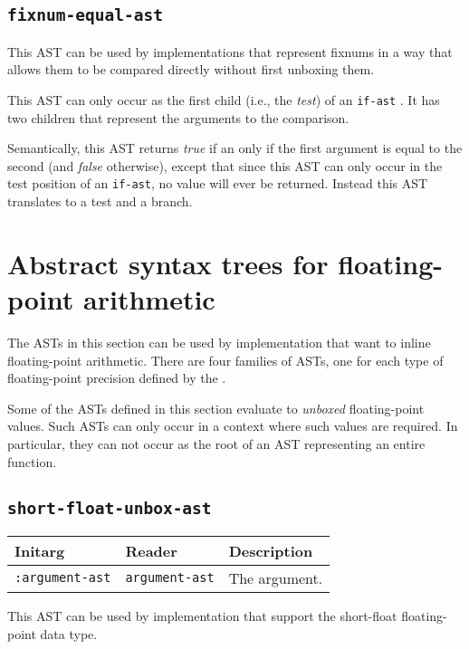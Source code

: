 \subsection{\texttt{fixnum-equal-ast}}
\label{fixnum-equal-ast}

This AST can be used by implementations that represent fixnums in a
way that allows them to be compared directly without first unboxing
them.

This AST can only occur as the first child (i.e., the \emph{test}) of
an \texttt{if-ast} .  It has two children that
represent the arguments to the comparison.  

Semantically, this AST returns \emph{true} if an only if the first
argument is equal to the second (and \emph{false} otherwise), except
that since this AST can only occur in the test position of an
\texttt{if-ast}, no value will ever be returned.  Instead this AST
translates to a test and a branch.

\section{Abstract syntax trees for floating-point arithmetic}
\label{sec-ast-floating-point-arithmetic}

The ASTs in this section can be used by implementation that want to
inline floating-point arithmetic.  There are four families of ASTs,
one for each type of floating-point precision defined by the \hs{}.

Some of the ASTs defined in this section evaluate to \emph{unboxed}
floating-point values.  Such ASTs can only occur in a context where
such values are required.  In particular, they can not occur as the
root of an AST representing an entire function.  

\subsection{\texttt{short-float-unbox-ast}}
\label{sec-ast-short-float-unbox}

\begin{tabular}{|l|l|l|}
\hline
Initarg & Reader & Description\\
\hline\hline
\texttt{:argument-ast} & \texttt{argument-ast} & The argument.\\
\hline
\end{tabular}

This AST can be used by implementation that support the short-float
floating-point data type.  


